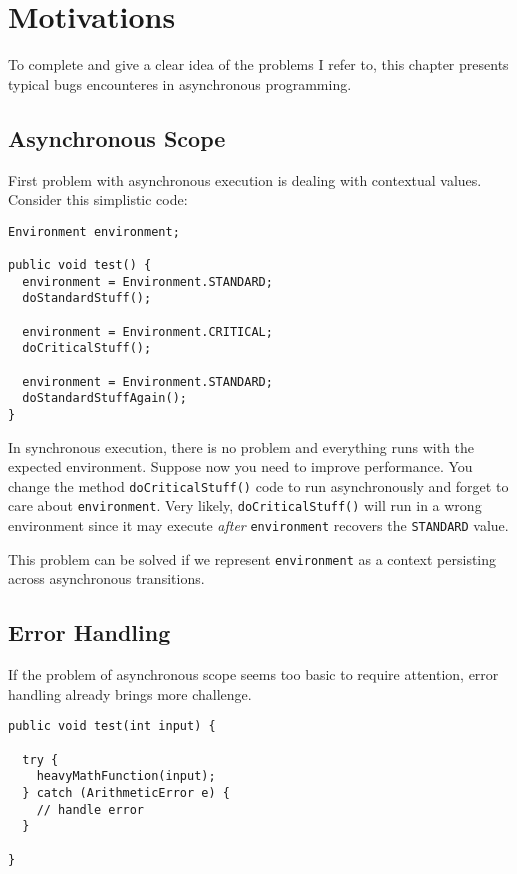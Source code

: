 
\chapter{Motivations}
\label{ch:motiv}
To complete and give a clear idea of the problems I refer to, this chapter presents typical bugs encounteres in asynchronous programming.

\section{Asynchronous Scope}

First problem with asynchronous execution is dealing with contextual values. Consider this simplistic code:

\begin{lstlisting}
Environment environment;

public void test() {
  environment = Environment.STANDARD;
  doStandardStuff();

  environment = Environment.CRITICAL;
  doCriticalStuff();

  environment = Environment.STANDARD;
  doStandardStuffAgain();
}
\end{lstlisting}

In synchronous execution, there is no problem and everything runs with the expected environment. Suppose now you need to improve performance. You change the method \lstinline{doCriticalStuff()} code to run asynchronously and forget to care about \lstinline{environment}. Very likely, \lstinline{doCriticalStuff()} will run in a wrong environment since it may execute \emph{after} \lstinline{environment} recovers the \lstinline{STANDARD} value.


This problem can be solved if we represent \lstinline{environment} as a context persisting across asynchronous transitions.


\section{Error Handling}

If the problem of asynchronous scope seems too basic to require attention, error handling already brings more challenge.

\begin{lstlisting}
public void test(int input) {
  
  try {
    heavyMathFunction(input);
  } catch (ArithmeticError e) {
    // handle error
  }

}
\end{lstlisting}

